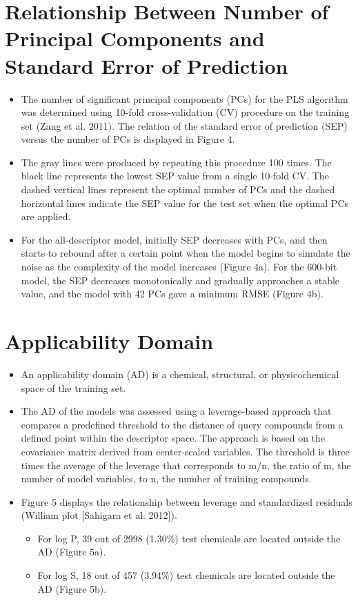 \documentclass[10pt, letter]{report}
\renewcommand{\=}{\, =\, }
\newcommand{\+}{\, +\, }
\renewcommand{\-}{\, -\, }
\begin{document}
\chapter{Relationship Between Number of Principal Components and Standard Error of Prediction}

\begin{itemize}
\item The number of significant principal components (PCs) for the PLS algorithm was
determined using 10-fold cross-validation (CV) procedure on the training set
(Zang et al. 2011). The relation of the standard error of prediction (SEP) versus
the number of PCs is displayed in Figure 4.
\item The gray lines were produced by repeating this procedure 100 times. The
black line represents the lowest SEP value from a single 10-fold CV. The
dashed vertical lines represent the optimal number of PCs and the dashed
horizontal lines indicate the SEP value for the test set when the optimal PCs
are applied.
\item For the all-descriptor model, initially SEP decreases with PCs, and then starts
to rebound after a certain point when the model begins to simulate the noise
as the complexity of the model increases (Figure 4a). For the 600-bit model,
the SEP decreases monotonically and gradually approaches a stable value,
and the model with 42 PCs gave a minimum RMSE (Figure 4b).
\end{itemize}

\chapter{Applicability Domain}

\begin{itemize}
\item An applicability domain (AD) is a chemical, structural, or physicochemical space of
the training set.
\item The AD of the models was assessed using a leverage-based approach that
compares a predefined threshold to the distance of query compounds from a
defined point within the descriptor space. The approach is based on the
covariance matrix derived from center-scaled variables. The threshold is three
times the average of the leverage that corresponds to m/n, the ratio of m, the
number of model variables, to n, the number of training compounds.
\item Figure 5 displays the relationship between leverage and standardized residuals
(William plot [Sahigara et al. 2012]).
\begin{itemize}
\item For log P, 39 out of 2998 (1.30\%) test chemicals are located outside the AD
(Figure 5a).
\item For log S, 18 out of 457 (3.94\%) test chemicals are located outside the AD
(Figure 5b).
\end{itemize}
\end{itemize}
\end{document}

